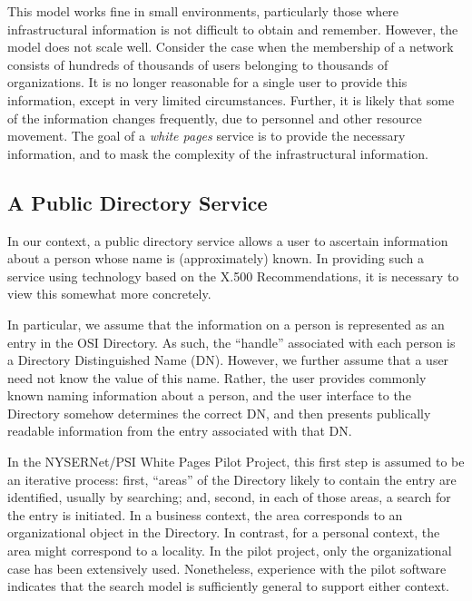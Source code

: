This model works fine in small environments,
particularly those where infrastructural information is not difficult to 
obtain and remember.
However,
the model does not scale well.
Consider the case when the membership of a network consists of hundreds of
thousands of users belonging to thousands of organizations.
It is no longer reasonable for a single user to provide this information,
except in very limited circumstances.
Further,
it is likely that some of the information changes frequently,
due to personnel and other resource movement.
The goal of a {\em white pages\/} service is to 
provide the necessary information, and to mask the complexity of the
infrastructural information.

\subsection	{A Public Directory Service}
In our context,
a public directory service allows a user to ascertain information
about a person whose name is (approximately) known.
In providing such a service using technology based on the X.500
Recommendations,
it is necessary to view this somewhat more concretely.

In particular,
we assume that the information on a person is represented as an entry in the
OSI Directory.
As such,
the ``handle'' associated with each person is a Directory Distinguished Name
(DN).
However,
we further assume that a user need not know the value of this name.
Rather,
the user provides commonly known naming information about a person,
and the user interface to the Directory somehow determines the correct DN,
and then presents publically readable information from the entry associated
with that DN.

In the NYSERNet/PSI White Pages Pilot Project,
this first step is assumed to be an iterative process:
first,
``areas'' of the Directory likely to contain the entry are identified,
usually by searching;
and,
second,
in each of those areas,
a search for the entry is initiated.
In a business context,
the area corresponds to an organizational object in the Directory.
In contrast,
for a personal context,
the area might correspond to a locality.
In the pilot project,
only the organizational case has been extensively used.
Nonetheless,
experience with the pilot software indicates that the search model is
sufficiently general to support either context.

